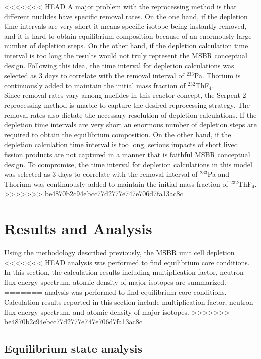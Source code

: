 \documentclass{anstrans}
\begin{document}
<<<<<<< HEAD
A major problem with the reprocessing method is that different nuclides have 
specific removal rates. On the one hand, if the depletion time intervals are 
very short it means specific isotope being instantly removed, and it is hard to 
obtain equilibrium composition because of an enormously large number of depletion 
steps. On the other hand, if the depletion calculation time interval is too 
long the results would not truly represent the \gls{MSBR} conceptual design. 
Following this idea, the time interval for depletion calculations was selected 
as 3 days to correlate with the removal interval of $^{233}$Pa. Thorium is 
continuously added to 
maintain the initial mass fraction of $^{232}$ThF$_4$.
=======
Since removal rates vary among nuclides in this reactor concept, the Serpent 2 
reprocessing method is unable to capture the desired reprocessing strategy. 
The removal rates also dictate the necessary resolution of depletion 
calculations. If the depletion time intervals are 
very short an enormous number of depletion steps are required to
obtain the equilibrium composition. On the other hand, if the depletion 
calculation time interval is too long, serious impacts of short lived fission 
products are not captured in a manner that is faithful \gls{MSBR} conceptual design. 
To compromise, the time interval for depletion calculations in this model was selected 
as 3 days to correlate with the removal interval of $^{233}$Pa and Thorium was 
continuously added to maintain the initial mass fraction of $^{232}$ThF$_4$.
>>>>>>> be4870b2c94ebcc77d2777e747e706d7fa13ac8c

\section{Results and Analysis}

Using the methodology described previously, the \gls{MSBR} unit cell depletion 
<<<<<<< HEAD
analysis was performed to find equilibrium core conditions. In this section, 
the calculation results including multiplication factor, neutron flux energy 
spectrum, atomic density of major isotopes are summarized.
=======
analysis was performed to find equilibrium core conditions. Calculation results reported 
in this section include multiplication factor, neutron flux energy 
spectrum, and atomic density of major isotopes.
>>>>>>> be4870b2c94ebcc77d2777e747e706d7fa13ac8c

\subsection{Equilibrium state analysis}
\end{document}
